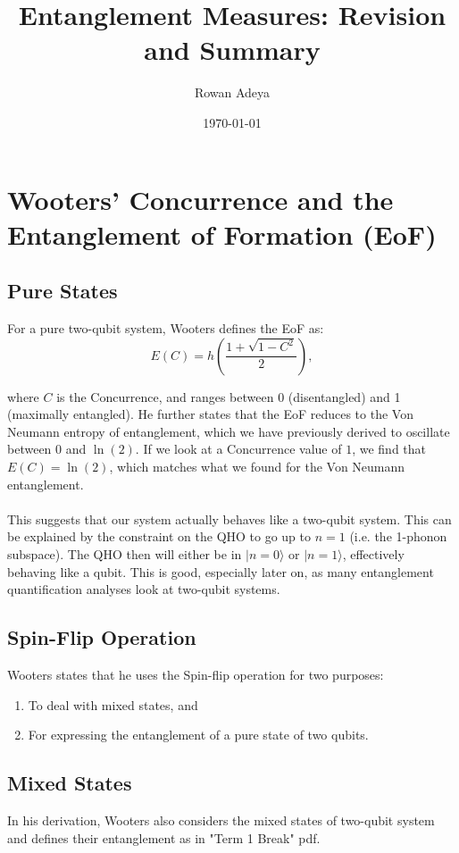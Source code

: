 \documentclass[12pt]{article}
\title{Entanglement Measures: Revision and Summary}
\author{Rowan Adeya}
\date{\today}
\begin{document}
\maketitle

\section{Wooters' Concurrence and the Entanglement of Formation (EoF)}

\subsection{Pure States}
For a pure two-qubit system, Wooters defines\cite{E_EoF_and_WC_Derivation} the EoF as:
\begin{equation}
    E(C) = h(\frac{1+\sqrt{1-C^2}}{2}),
\end{equation}

where $C$ is the Concurrence, and ranges between 0 (disentangled) and 1 (maximally entangled). He further states that the EoF reduces to the Von Neumann entropy of entanglement, which we have previously derived to oscillate between $0$ and $\ln(2)$. If we look at a Concurrence value of $1$, we find that $E(C)=\ln(2)$, which matches what we found for the Von Neumann entanglement. \\
\\
This suggests that our system actually behaves like a two-qubit system. This can be explained by the constraint on the QHO to go up to $n=1$ (i.e. the 1-phonon subspace). The QHO then will either be in $|n= 0 \rangle$ or $|n= 1 \rangle$, effectively behaving like a qubit. This is good, especially later on, as many entanglement quantification analyses look at two-qubit systems. 

\subsection{Spin-Flip Operation}
Wooters states that he uses the Spin-flip operation for two purposes:
\begin{enumerate}
    \item To deal with mixed states, and
    \item For expressing the entanglement of a pure state of two qubits.
\end{enumerate}

\subsection{Mixed States}
In his derivation\cite{E_EoF_and_WC_Derivation}, Wooters also considers the mixed states of two-qubit system and defines their entanglement as in "Term 1 Break" pdf. 
\newpage
\end{document}

